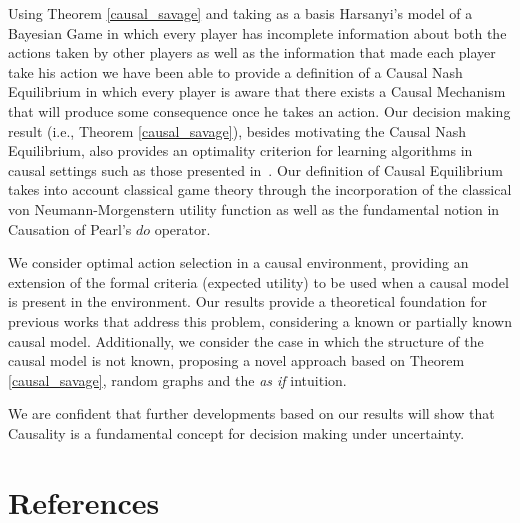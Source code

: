 \documentclass[review]{elsarticle}
\begin{document}
Using Theorem \ref{causal_savage} and taking as a basis Harsanyi's model of a Bayesian Game in which every player has incomplete information about both the actions taken by other players as well as the information that made each player take his action we have been able to provide a definition of a Causal Nash Equilibrium in which every player is aware that there exists a Causal Mechanism that will produce some consequence once he takes an action. Our decision making result (i.e., Theorem \ref{causal_savage}), besides motivating the Causal Nash Equilibrium, also provides an optimality criterion for learning algorithms in causal settings such as those presented in~\cite{lattimoreNIPS2016,sen2017identifying}. Our definition of Causal Equilibrium takes into account classical game theory through the incorporation of the classical von Neumann-Morgenstern utility function as well as the fundamental notion in Causation of Pearl's $do$ operator. 

We consider optimal action selection in a causal environment, providing an extension of the formal criteria (expected utility) to be used when a causal model is present in the environment. Our results provide a theoretical foundation for previous works that address this problem, considering a known or partially known causal model. Additionally, we consider the case in which the structure of the causal model is not known, proposing a novel approach based on Theorem \ref{causal_savage}, random graphs and the \textit{as if} intuition.

We are confident that further developments based on our results will show that Causality is a fundamental concept for decision making under uncertainty.


\section*{References}

\end{document}
